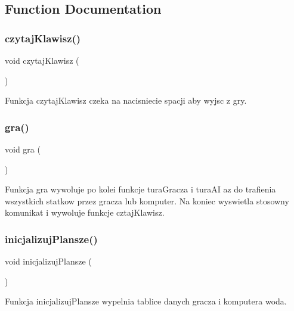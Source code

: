 \subsection{Function Documentation}
\mbox{\label{znaki_8c_ad2249dca20181f9de74aa2293e733e05}} 
\subsubsection{czytaj\+Klawisz()}
{\footnotesize\ttfamily void czytaj\+Klawisz (\begin{DoxyParamCaption}{ }\end{DoxyParamCaption})}



Funkcja czytaj\+Klawisz czeka na nacisniecie spacji aby wyjsc z gry. 

\mbox{\label{znaki_8c_a472d54e5297c6dfea59903654de33ee8}} 
\subsubsection{gra()}
{\footnotesize\ttfamily void gra (\begin{DoxyParamCaption}{ }\end{DoxyParamCaption})}



Funkcja gra wywoluje po kolei funkcje tura\+Gracza i tura\+AI az do trafienia wszystkich statkow przez gracza lub komputer. Na koniec wyswietla stosowny komunikat i wywoluje funkcje cztaj\+Klawisz. 

\mbox{\label{znaki_8c_a7c96ca45f748c1ab1555bc6723b2fb37}} 
\subsubsection{inicjalizuj\+Plansze()}
{\footnotesize\ttfamily void inicjalizuj\+Plansze (\begin{DoxyParamCaption}{ }\end{DoxyParamCaption})}



Funkcja inicjalizuj\+Plansze wypelnia tablice danych gracza i komputera woda. 

\mbox{\label{znaki_8c_ae66f6b31b5ad750f1fe042a706a4e3d4}} 

